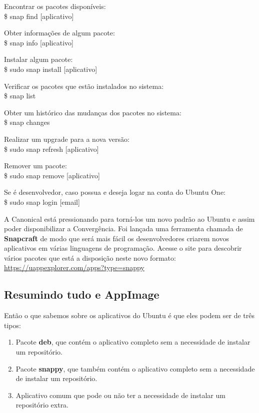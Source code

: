 Encontrar os pacotes disponíveis: \\
{\ttfamily\$ snap find [aplicativo]}

Obter informações de algum pacote: \\
{\ttfamily\$ snap info [aplicativo]}

Instalar algum pacote: \\
{\ttfamily\$ sudo snap install [aplicativo]}

Verificar os pacotes que estão instalados no sistema: \\
{\ttfamily\$ snap list}

Obter um histórico das mudanças dos pacotes no sistema: \\
{\ttfamily\$ snap changes}

Realizar um upgrade para a nova versão: \\
{\ttfamily\$ sudo snap refresh [aplicativo]}

Remover um pacote: \\
{\ttfamily\$ sudo snap remove [aplicativo]}

Se é desenvolvedor, caso possua e deseja logar na conta do Ubuntu One: \\
{\ttfamily\$ sudo snap login [email]}

A Canonical está pressionando para torná-los um novo padrão ao Ubuntu e assim poder disponibilizar a Convergência. Foi lançada uma ferramenta chamada de \textbf{Snapcraft} de modo que será mais fácil os desenvolvedores criarem novos aplicativos em várias linguagens de programação. Acesse o site para descobrir vários pacotes que está a disposição neste novo formato: \url{https://uappexplorer.com/apps?type=snappy}

\subsection{Resumindo tudo e AppImage}
Então o que sabemos sobre os aplicativos do Ubuntu é que eles podem ser de três tipos: \vspace{-1em}
\begin{enumerate}[noitemsep]
 \item Pacote \textbf{deb}, que contém o aplicativo completo sem a necessidade de instalar um repositório.
 \item Pacote \textbf{snappy}, que também contém o aplicativo completo sem a necessidade de instalar um repositório.
 \item Aplicativo comum que pode ou não ter a necessidade de instalar um repositório extra.
\end{enumerate}

